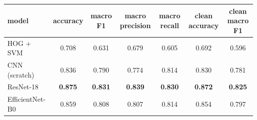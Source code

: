 \begin{tabular}{lcccccc}
\toprule
model & accuracy & macro F1 & macro precision & macro recall & clean accuracy & clean macro F1 \\
\midrule
HOG + SVM & 0.708 & 0.631 & 0.679 & 0.605 & 0.692 & 0.596 \\
CNN (scratch) & 0.836 & 0.790 & 0.774 & 0.814 & 0.830 & 0.781 \\
ResNet-18 & \bfseries 0.875 & \bfseries 0.831 & \bfseries 0.839 & \bfseries 0.830 & \bfseries 0.872 & \bfseries 0.825 \\
EfficientNet-B0 & 0.859 & 0.808 & 0.807 & 0.814 & 0.854 & 0.797 \\
\bottomrule
\end{tabular}
